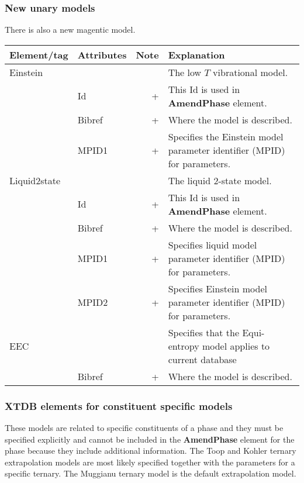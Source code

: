 \documentclass{article}
\begin{document}
\subsubsection{New unary models}

There is also a new magentic model.

\bigskip
\begin{tabular}{|p{} p{} r p{}|}\hline
  Element/tag & Attributes & Note & Explanation\\\hline

  Einstein & && The low $T$ vibrational model.\\
      & Id & + & This Id is used in {\bf AmendPhase} element.\\
      & Bibref & + & Where the model is described.\\
      & MPID1 & + & Specifies the Einstein model parameter identifier (MPID) for parameters.\\\hline

  Liquid2state & && The liquid 2-state model.\\
      & Id & + & This Id is used in {\bf AmendPhase} element.\\
      & Bibref & + & Where the model is described.\\
      & MPID1 & + & Specifies liquid model parameter identifier (MPID) for parameters.\\
      & MPID2 & + & Specifies Einstein model parameter identifier (MPID) for parameters.\\\hline

  EEC & && Specifies that the Equi-entropy model applies to current database\\
      & Bibref & + & Where the model is described.\\\hline

\end{tabular}

\subsubsection{XTDB elements for constituent specific models}\label{sec:toop}

These models are related to specific constituents of a phase and they
must be specified explicitly and cannot be included in the {\bf
  AmendPhase} element for the phase because they include additional
information.  The Toop and Kohler ternary extrapolation models are
most likely specified together with the parameters for a specific
ternary.  The Muggianu ternary model is the default extrapolation
model.
\end{document}
